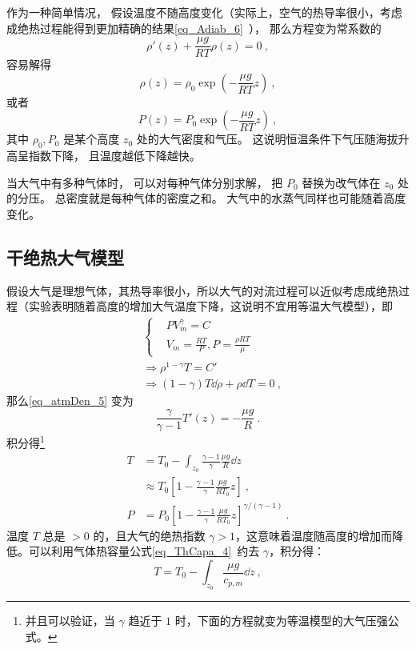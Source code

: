 作为一种简单情况， 假设温度不随高度变化（实际上，空气的热导率很小，考虑成绝热过程能得到更加精确的结果\autoref{eq_Adiab_6}~）， 那么方程变为常系数的
\begin{equation}
\rho'(z)  +  \frac{\mu g}{RT}\rho(z) = 0~,
\end{equation}
容易解得
\begin{equation}\label{eq_atmDen_2}
\rho(z) = \rho_0\exp(-\frac{\mu g}{RT} z)~,
\end{equation}
或者
\begin{equation}\label{eq_atmDen_4}
P(z) = P_0\exp(-\frac{\mu g}{RT} z)~,
\end{equation}
其中 $\rho_0, P_0$ 是某个高度 $z_0$ 处的大气密度和气压。 这说明恒温条件下气压随海拔升高呈指数下降， 且温度越低下降越快。

当大气中有多种气体时， 可以对每种气体分别求解， 把 $P_0$ 替换为改气体在 $z_0$ 处的分压。 总密度就是每种气体的密度之和。 大气中的水蒸气同样也可能随着高度变化。

\subsection{干绝热大气模型}

假设大气是理想气体，其热导率很小，所以大气的对流过程可以近似考虑成绝热过程（实验表明随着高度的增加大气温度下降，这说明不宜用等温大气模型），即
\begin{equation}
\begin{aligned}
&\begin{cases}
&PV_m^\gamma=C\\
&V_m=\frac{RT}{P},P=\frac{\rho R T}{\mu}
\end{cases}
\\
&\Rightarrow \rho^{1-\gamma}T=C'\\
&\Rightarrow (1-\gamma)T\dd \rho+\rho\dd T=0  ~,
\end{aligned}
\end{equation}
那么\autoref{eq_atmDen_5} 变为
\begin{equation}
\frac{\gamma}{\gamma-1}T'(z)=-\frac{\mu g}{R}~.
\end{equation}
积分得\footnote{
并且可以验证，当 $\gamma$ 趋近于 $1$ 时，下面的方程就变为等温模型的大气压强公式。}
\begin{equation}
\begin{aligned}
T&=T_0-\int_{z_0}\frac{\gamma-1}{\gamma}\frac{\mu g}{R} \dd z\\&\approx T_0\left[1-\frac{\gamma-1}{\gamma}\frac{\mu g}{R T_0}z\right]~,\\ 
P&=P_0\left[1-\frac{\gamma-1}{\gamma}\frac{\mu g}{R T_0}z\right]^{\gamma/(\gamma-1)}~.
\end{aligned}
\end{equation}
温度 $T$ 总是 $>0$ 的，且大气的绝热指数 $\gamma>1$，这意味着温度随高度的增加而降低。可以利用气体热容量公式\autoref{eq_ThCapa_4}~约去 $\gamma$，积分得：
\begin{equation}
T=T_0-\int_{z_0}\frac{\mu g}{c_{p,m}} \dd z ~,
\end{equation}

